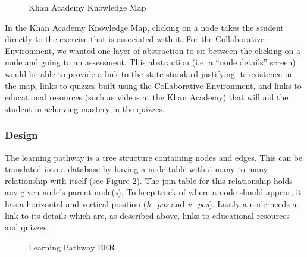 \begin{figure}[h!]
	\centering
	\caption{Khan Academy Knowledge Map}
	\label{fig:screens-pathway-khan-map}
\end{figure}

In the Khan Academy Knowledge Map, clicking on a node takes the student directly to the exercise that is associated with it. For the Collaborative Environment, we wanted one layer of abstraction to sit between the clicking on a node and going to an assessment. This abstraction (i.e. a ``node details'' screen) would be able to provide a link to the state standard justifying its existence in the map, links to quizzes built using the Collaborative Environment, and links to educational resources (such as videos at the Khan Academy) that will aid the student in achieving mastery in the quizzes.

\subsubsection{Design}
The learning pathway is a tree structure containing nodes and edges. This can be translated into a database by having a node table with a many-to-many relationship with itself (see Figure \ref{fig:er-pathway}). The join table for this relationship holds any given node's parent node(s). To keep track of where a node should appear, it has a horizontal and vertical position (\emph{h\_pos} and \emph{v\_pos}). Lastly a node needs a link to its details which are, as described above, links to educational resources and quizzes.
\begin{figure}[h!]
	\centering
	\caption{Learning Pathway EER}
	\label{fig:er-pathway}
\end{figure}

